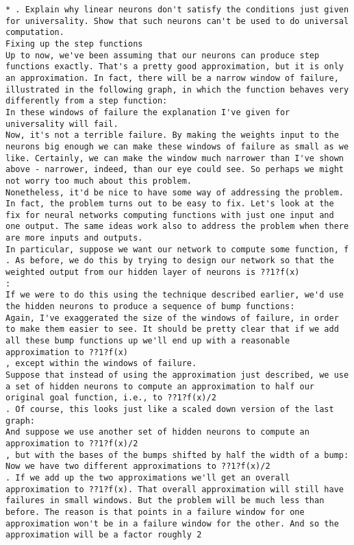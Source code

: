\begin{lstlisting}
* . Explain why linear neurons don't satisfy the conditions just given for universality. Show that such neurons can't be used to do universal computation. 
Fixing up the step functions
Up to now, we've been assuming that our neurons can produce step functions exactly. That's a pretty good approximation, but it is only an approximation. In fact, there will be a narrow window of failure, illustrated in the following graph, in which the function behaves very differently from a step function:
In these windows of failure the explanation I've given for universality will fail.
Now, it's not a terrible failure. By making the weights input to the neurons big enough we can make these windows of failure as small as we like. Certainly, we can make the window much narrower than I've shown above - narrower, indeed, than our eye could see. So perhaps we might not worry too much about this problem.
Nonetheless, it'd be nice to have some way of addressing the problem.
In fact, the problem turns out to be easy to fix. Let's look at the fix for neural networks computing functions with just one input and one output. The same ideas work also to address the problem when there are more inputs and outputs.
In particular, suppose we want our network to compute some function, f
. As before, we do this by trying to design our network so that the weighted output from our hidden layer of neurons is ??1?f(x)
:
If we were to do this using the technique described earlier, we'd use the hidden neurons to produce a sequence of bump functions:
Again, I've exaggerated the size of the windows of failure, in order to make them easier to see. It should be pretty clear that if we add all these bump functions up we'll end up with a reasonable approximation to ??1?f(x)
, except within the windows of failure.
Suppose that instead of using the approximation just described, we use a set of hidden neurons to compute an approximation to half our original goal function, i.e., to ??1?f(x)/2
. Of course, this looks just like a scaled down version of the last graph:
And suppose we use another set of hidden neurons to compute an approximation to ??1?f(x)/2
, but with the bases of the bumps shifted by half the width of a bump:
Now we have two different approximations to ??1?f(x)/2
. If we add up the two approximations we'll get an overall approximation to ??1?f(x). That overall approximation will still have failures in small windows. But the problem will be much less than before. The reason is that points in a failure window for one approximation won't be in a failure window for the other. And so the approximation will be a factor roughly 2

\end{lstlisting}
